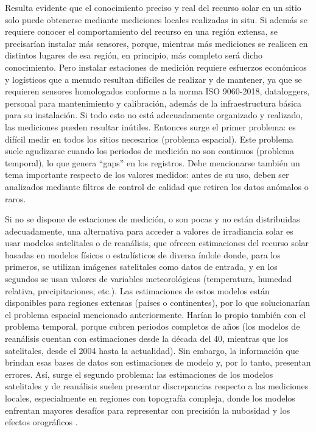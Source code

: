 \documentclass[letterpaper,12pt, twoside]{report}
\providecommand{\DIFdeltex}[1]{{\protect\color{red} \scriptsize #1}} %
\providecommand{\DIFdel}[1]{\texorpdfstring{\DIFdeltex{#1}}{}} %
\begin{document}
\DIFdel{Resulta evidente que el conocimiento preciso y real del recurso solar en un sitio solo puede obtenerse mediante mediciones locales realizadas in situ. Si además se requiere conocer el comportamiento del recurso en una región extensa, se precisarían instalar más sensores, porque, mientras más mediciones se realicen en distintos lugares de esa región, en principio, más completo será dicho conocimiento. Pero instalar estaciones de medición requiere esfuerzos económicos y logísticos que a menudo resultan difíciles de realizar y de mantener, ya que se requieren sensores homologados conforme a la norma ISO 9060-2018, dataloggers, personal para mantenimiento y calibración, además de la infraestructura básica para su instalación. Si todo esto no está adecuadamente organizado y realizado, las mediciones pueden resultar inútiles. Entonces surge el primer problema: es difícil medir en todos los sitios necesarios (problema espacial). Este problema suele agudizarse cuando los periodos de medición no son continuos (problema temporal), lo que genera “gaps” en los registros. Debe mencionarse también un tema importante respecto de los valores medidos: antes de su uso, deben ser analizados mediante filtros de control de calidad que retiren los datos anómalos o raros.
}%

\DIFdel{Si no se dispone de estaciones de medición, o son pocas y no están distribuidas adecuadamente, una alternativa para acceder a valores de irradiancia solar es usar modelos satelitales o de reanálisis, que ofrecen estimaciones del recurso solar basadas en modelos físicos o estadísticos de diversa índole donde, para los primeros, se utilizan imágenes satelitales como datos de entrada, y en los segundos se usan valores de variables meteorológicas (temperatura, humedad relativa, precipitaciones, etc.). Las estimaciones de estos modelos están disponibles para regiones extensas (países o continentes), por lo que solucionarían el problema espacial mencionado anteriormente. Harían lo propio también con el problema temporal, porque cubren periodos completos de años (los modelos de reanálisis cuentan con estimaciones desde la década del 40, mientras que los satelitales, desde el 2004 hasta la actualidad). Sin embargo, la información que brindan esas bases de datos son estimaciones de modelo y, por lo tanto, presentan errores. Así, surge el segundo problema: las estimaciones de los modelos satelitales y de reanálisis suelen presentar discrepancias respecto a las mediciones locales, especialmente en regiones con topografía compleja, donde los modelos enfrentan mayores desafíos para representar con precisión la nubosidad y los efectos orográficos \citep{Perez2002, Greuell2013, Sengupta2024}.
}%
\end{document}

